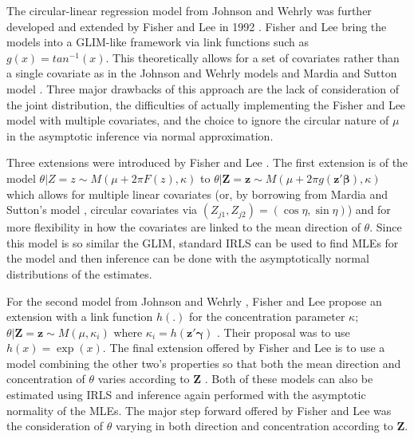 The circular-linear regression model from Johnson and Wehrly \cite{johnson_angular-linear_1978} was further developed and extended by Fisher and Lee in 1992 \cite{fisher_regression_1992}. Fisher and Lee bring the models into a GLIM-like framework via link functions such as $g(x) = tan^{-1}(x)$. This theoretically allows for a set of covariates rather than a single covariate as in the Johnson and Wehrly models \cite{johnson_angular-linear_1978} and Mardia and Sutton model \cite{mardia_model_1978}. Three major drawbacks of this approach are the lack of consideration of the joint distribution, the difficulties of actually implementing the Fisher and Lee model with multiple covariates, and the choice to ignore the circular nature of $\mu$ in the asymptotic inference via normal approximation. 

Three extensions were introduced by Fisher and Lee \cite{fisher_regression_1992}. The first extension is of the model $\theta | Z = z \sim M(\mu + 2\pi F(z), \kappa)$ to $\theta | \mathbf{Z} = \mathbf{z} \sim M(\mu + 2\pi g(\mathbf{z}'\bm{\beta}), \kappa)$ which allows for multiple linear covariates (or, by borrowing from Mardia and Sutton's model \cite{mardia_model_1978}, circular covariates via $(Z_{j1}, Z_{j2}) = (\cos\eta, \sin\eta)$) and for more flexibility in how the covariates are linked to the mean direction of $\theta$. Since this model is so similar the GLIM, standard IRLS can be used to find MLEs for the model and then inference can be done with the asymptotically normal distributions of the estimates. 

For the second model from Johnson and Wehrly \cite{johnson_angular-linear_1978}, Fisher and Lee propose an extension with a link function $h(.)$ for the concentration parameter $\kappa$; $\theta | \mathbf{Z} = \mathbf{z} \sim M(\mu, \kappa_i)$ where $\kappa_i = h(\mathbf{z}'\bm{\gamma})$ \cite{fisher_regression_1992}. Their proposal was to use $h(x) = \exp(x)$. The final extension offered by Fisher and Lee is to use a model combining the other two's properties so that both the mean direction and concentration of $\theta$ varies according to $\mathbf{Z}$ \cite{fisher_regression_1992}. Both of these models can also be estimated using IRLS and inference again performed with the asymptotic normality of the MLEs. The major step forward offered by Fisher and Lee was the consideration of $\theta$ varying in both direction and concentration according to $\mathbf{Z}$. 


